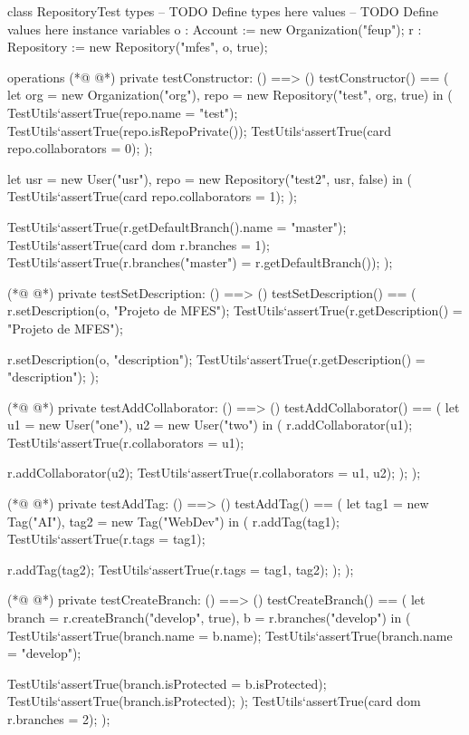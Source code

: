 \begin{vdmpp}[breaklines=true]
class RepositoryTest
types
-- TODO Define types here
values
-- TODO Define values here
instance variables
 o : Account := new Organization("feup");
 r : Repository := new Repository("mfes", o, true);

operations
(*@
\label{testConstructor:11}
@*)
 private testConstructor: () ==> ()
 testConstructor() == (
  let org = new Organization("org"), repo = new Repository("test", org, true) in (
   TestUtils`assertTrue(repo.name = "test");
   TestUtils`assertTrue(repo.isRepoPrivate());
   TestUtils`assertTrue(card repo.collaborators = 0);
  );
  
  let usr = new User("usr"), repo = new Repository("test2", usr, false) in (
   TestUtils`assertTrue(card repo.collaborators = 1);
  );
  
  TestUtils`assertTrue(r.getDefaultBranch().name = "master");
  TestUtils`assertTrue(card dom r.branches = 1);
  TestUtils`assertTrue(r.branches("master") = r.getDefaultBranch());
 );

(*@
\label{testSetDescription:28}
@*)
 private testSetDescription: () ==> ()
 testSetDescription() == (
  r.setDescription(o, "Projeto de MFES");
  TestUtils`assertTrue(r.getDescription() = "Projeto de MFES");
  
  r.setDescription(o, "description");
  TestUtils`assertTrue(r.getDescription() = "description");
 );
 
(*@
\label{testAddCollaborator:37}
@*)
 private testAddCollaborator: () ==> ()
 testAddCollaborator() == (
  let u1 = new User("one"), u2 = new User("two") in (
   r.addCollaborator(u1);
   TestUtils`assertTrue(r.collaborators = {u1});
   
   r.addCollaborator(u2);
   TestUtils`assertTrue(r.collaborators = {u1, u2});
  );
 );
 
(*@
\label{testAddTag:48}
@*)
 private testAddTag: () ==> ()
 testAddTag() == (
  let tag1 = new Tag("AI"), tag2 = new Tag("WebDev") in (
   r.addTag(tag1);
   TestUtils`assertTrue(r.tags = {tag1});
   
   r.addTag(tag2);
   TestUtils`assertTrue(r.tags = {tag1, tag2});
  );
 );
 
(*@
\label{testCreateBranch:59}
@*)
 private testCreateBranch: () ==> ()
 testCreateBranch() == (
  let branch = r.createBranch("develop", true), b = r.branches("develop") in (
   TestUtils`assertTrue(branch.name = b.name);
   TestUtils`assertTrue(branch.name = "develop");
   
   TestUtils`assertTrue(branch.isProtected = b.isProtected);
   TestUtils`assertTrue(branch.isProtected);
  );
  TestUtils`assertTrue(card dom r.branches = 2);
 );
 

\end{vdmpp}

